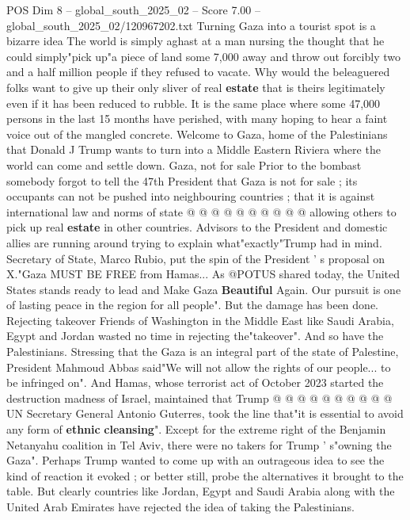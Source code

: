 \begin{textsample}{POS Dim 8 – global\_south\_2025\_02 – Score 7.00 – global\_south\_2025\_02/120967202.txt}  \label{ex:f8_pos_078}
Turning Gaza into a tourist spot is a bizarre idea The world is simply aghast at a man nursing the thought that he could simply"pick up"a piece of land some 7,000 away and throw out forcibly two and a half million people if they refused to vacate.
Why would the beleaguered folks want to give up their only sliver of real \textbf{estate} that is theirs legitimately even if it has been reduced to rubble.
It is the same place where some 47,000 persons in the last 15 months have perished, with many hoping to hear a faint voice out of the mangled concrete.
Welcome to Gaza, home of the Palestinians that Donald J Trump wants to turn into a Middle Eastern Riviera where the world can come and settle down.
Gaza, not for sale Prior to the bombast somebody forgot to tell the 47th President that Gaza is not for sale ; its occupants can not be pushed into neighbouring countries ; that it is against international law and norms of state @ @ @ @ @ @ @ @ @ @ allowing others to pick up real \textbf{estate} in other countries.
Advisors to the President and domestic allies are running around trying to explain what"exactly"Trump had in mind.
Secretary of State, Marco Rubio, put the spin of the President ' s proposal on X."Gaza MUST BE FREE from Hamas...
As @POTUS shared today, the United States stands ready to lead and Make Gaza \textbf{Beautiful} Again.
Our pursuit is one of lasting peace in the region for all people".
But the damage has been done.
Rejecting takeover Friends of Washington in the Middle East like Saudi Arabia, Egypt and Jordan wasted no time in rejecting the"takeover".
And so have the Palestinians.
Stressing that the Gaza is an integral part of the state of Palestine, President Mahmoud Abbas said"We will not allow the rights of our people... to be infringed on".
And Hamas, whose terrorist act of October 2023 started the destruction madness of Israel, maintained that Trump @ @ @ @ @ @ @ @ @ @ UN Secretary General Antonio Guterres, took the line that"it is essential to avoid any form of \textbf{ethnic} \textbf{cleansing}".
Except for the extreme right of the Benjamin Netanyahu coalition in Tel Aviv, there were no takers for Trump ' s"owning the Gaza".
Perhaps Trump wanted to come up with an outrageous idea to see the kind of reaction it evoked ; or better still, probe the alternatives it brought to the table.
But clearly countries like Jordan, Egypt and Saudi Arabia along with the United Arab Emirates have rejected the idea of taking the Palestinians.

\end{textsample}
